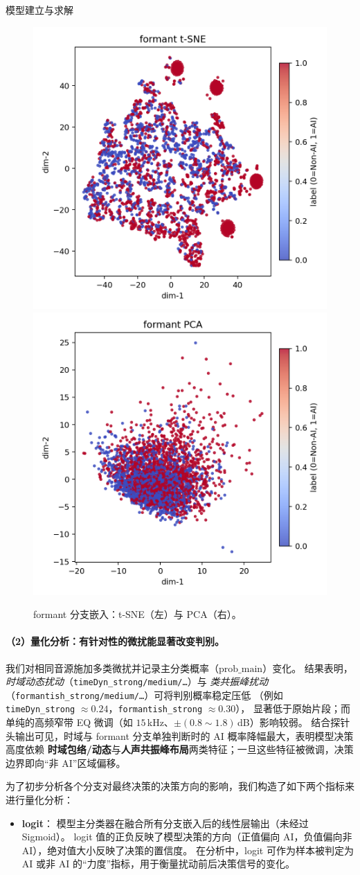 \documentclass[aspectratio=169]{beamer}
\begin{document}
\begin{frame}{模型建立与求解}
\begin{figure}[H]
  \centering
  \includegraphics[width=.4\linewidth]{images_in_paper/embed_formant_tsne.png}
  \includegraphics[width=.4\linewidth]{images_in_paper/embed_formant_pca.png}
  \caption{formant 分支嵌入：t-SNE（左）与 PCA（右）。}
  \label{fig:formant_tsne}
  \label{fig:formant_pca}
\end{figure}

\paragraph{（2）量化分析：有针对性的微扰能显著改变判别。}
我们对相同音源施加多类微扰并记录主分类概率（$\mathrm{prob\_main}$）变化。
结果表明，\emph{时域动态扰动}（\texttt{timeDyn\_strong/medium/\ldots}）与
\emph{类共振峰扰动}（\texttt{formantish\_strong/medium/\ldots}）可将判别概率稳定压低
（例如 \texttt{timeDyn\_strong} $\approx 0.24$，\texttt{formantish\_strong} $\approx 0.30$），
显著低于原始片段；而单纯的高频窄带 EQ 微调（如 $15$\,kHz、$\pm(0.8\!\sim\!1.8)$\,dB）影响较弱。
结合探针头输出可见，时域与 formant 分支单独判断时的 AI 概率降幅最大，表明模型决策高度依赖
\textbf{时域包络/动态}与\textbf{人声共振峰布局}两类特征；一旦这些特征被微调，决策边界即向“非 AI”区域偏移。

为了初步分析各个分支对最终决策的决策方向的影响，我们构造了如下两个指标来进行量化分析：
\begin{itemize}
  \item \textbf{logit}：
  模型主分类器在融合所有分支嵌入后的线性层输出（未经过 Sigmoid）。
  logit 值的正负反映了模型决策的方向（正值偏向 AI，负值偏向非 AI），绝对值大小反映了决策的置信度。
  在分析中，logit 可作为样本被判定为 AI 或非 AI 的“力度”指标，用于衡量扰动前后决策信号的变化。


\end{itemize}
\end{frame}
\end{document}
